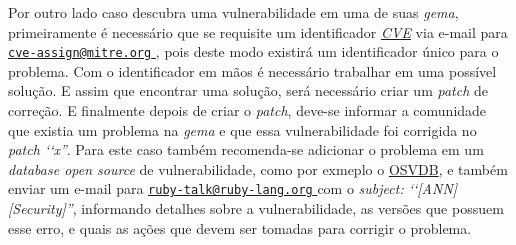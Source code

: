 Por outro lado caso descubra uma vulnerabilidade em uma de suas \emph{gema}, primeiramente
é necessário que se requisite um identificador \emph{\href{https://cve.mitre.org/}{CVE}} via e-mail para
\href{mailto:cve-assign@mitre.org}{\nolinkurl{cve-assign@mitre.org} }, pois deste modo existirá
um identificador único para o problema. Com o identificador em mãos é necessário trabalhar em uma
possível solução. E assim que encontrar uma solução, será necessário criar um \emph{patch} de correção.
E finalmente depois de criar o \emph{patch}, deve-se informar a comunidade que existia um problema na
\emph{gema} e que essa vulnerabilidade foi corrigida no \emph{patch ‘‘x''}. Para este caso também
recomenda-se adicionar o problema em um \emph{database open source} de vulnerabilidade, como por exmeplo o
\href{http://osvdb.org/}{OSVDB}, e também enviar um e-mail para \href{mailto:ruby-talk@ruby-lang.org}
{\nolinkurl{ruby-talk@ruby-lang.org} } com o \emph{subject: ‘‘[ANN][Security]''}, informando detalhes
sobre a vulnerabilidade, as versões que possuem esse erro, e quais as ações que devem ser tomadas
para corrigir o problema.
